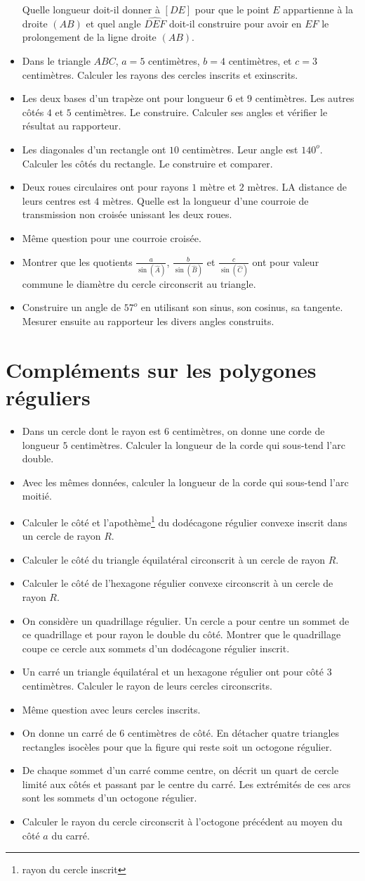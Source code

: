 \documentclass[12 pt]{report}
\theoremstyle{plain}
\newcounter{n}
\renewcommand{\it}{\item[$\mathbf{\then}.$]\stepcounter{n} }
\begin{document}
\begin{itemize}
Quelle longueur doit-il donner à $[DE]$ pour que le point $E$ appartienne à la droite $(AB)$ et quel angle $\widehat{DEF}$ doit-il construire pour avoir en $EF$ le prolongement de la ligne droite $(AB)$. 
\it Dans le triangle $ABC$, $a=5$ centimètres, $b=4$ centimètres, et $c=3$ centimètres. Calculer les rayons des cercles inscrits et exinscrits. 
\it Les deux bases d'un trapèze ont pour longueur $6$ et $9$ centimètres. Les autres côtés $4$ et $5$ centimètres. Le construire. Calculer ses angles et vérifier le résultat au rapporteur. 
\it Les diagonales d'un rectangle ont $10$ centimètres. Leur angle est $140^o$. Calculer les côtés du rectangle. Le construire et comparer. 
\it Deux roues circulaires ont pour rayons $1$ mètre et $2$ mètres. LA distance de leurs centres est $4$ mètres. Quelle est la longueur d'une courroie de transmission non croisée unissant les deux roues. 
\it Même question pour une courroie croisée. 
\it Montrer que les quotients $\frac{a}{\sin(\widehat{A})}$, $\frac{b}{\sin(\widehat{B})}$ et $\frac{c}{\sin(\widehat{C})}$ ont pour valeur commune le diamètre du cercle circonscrit au triangle. 
\it Construire un angle de $57^o$ en utilisant son sinus, son cosinus, sa tangente. Mesurer ensuite au rapporteur les divers angles construits. 
\end{itemize}
\chapter{Compléments sur les polygones réguliers}
\begin{itemize}
\item Dans un cercle dont le rayon est $6$ centimètres, on donne une corde de longueur $5$ centimètres. Calculer la longueur de la corde qui sous-tend l'arc double. 
\it Avec les mêmes données, calculer la longueur de la corde qui sous-tend l'arc moitié. 
\it Calculer le côté et l'apothème\footnote{rayon du cercle inscrit} du dodécagone régulier convexe inscrit dans un cercle de rayon $R$. 
\it Calculer le côté du triangle équilatéral circonscrit à un cercle de rayon $R$. 
\it Calculer le côté de l'hexagone régulier convexe circonscrit à un cercle de rayon $R$. 
\it On considère un quadrillage régulier. Un cercle a pour centre un sommet de ce quadrillage et pour rayon le double du côté. Montrer que le quadrillage coupe ce cercle aux sommets d'un dodécagone régulier inscrit. 
\it Un carré un triangle équilatéral et un hexagone régulier ont pour côté $3$ centimètres. Calculer le rayon de leurs cercles circonscrits. 
\it Même question avec leurs cercles inscrits.
\it On donne un carré de $6$ centimètres de côté. En détacher quatre triangles rectangles isocèles pour que la figure qui reste soit un octogone régulier. 
\it De chaque sommet d'un carré comme centre, on décrit un quart de cercle limité aux côtés et passant par le centre du carré. Les extrémités de ces arcs sont les sommets d'un octogone régulier. 
\it Calculer le rayon du cercle circonscrit à l'octogone précédent au moyen du côté $a$ du carré. 
\end{itemize}
 
\end{document}
